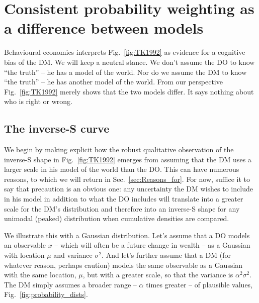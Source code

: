 \documentclass[a4paper, 12pt]{article}
\newcommand{\fref}[1]{Fig.~\ref{fig:#1}}
\newcommand{\seclabel}[1]{\label{sec:#1}}
\newcommand{\secref}[1]{Sec.~\ref{sec:#1}}
\newcommand{\MK}[1]{{\it ***MK: #1 MK***}}
\begin{document}


\section{Consistent probability weighting as a difference between models} \seclabel{ModelDiff}

Behavioural economics interprets \fref{TK1992} as evidence for a cognitive bias of the DM. We will keep a neutral stance. We don't assume the DO to know ``the truth'' -- he has a model of the world. Nor do we assume the DM to know ``the truth'' -- he has another model of the world. From our perspective \fref{TK1992} merely shows that the two models differ. It says nothing about who is right or wrong.



\subsection{The inverse-S curve\seclabel{The_inverse}}
We begin by making explicit how the robust qualitative observation of the inverse-S shape in \fref{TK1992} emerges from assuming that the DM uses a larger scale in his model of the world than the DO. This can have numerous reasons, to which we will return in \secref{Reasons_for}. For now, suffice it to say that precaution is an obvious one: any uncertainty the DM wishes to include in his model in addition to what the DO includes will translate into a greater scale for the DM's distribution and therefore into an inverse-S shape for any unimodal (peaked) distribution when cumulative densities are compared.

We illustrate this with a Gaussian distribution.
Let's assume that a DO models an observable $x$ -- which will often be a future change in wealth -- as a Gaussian with location $\mu$ and variance $\sigma^2$. And let's further assume that a DM (for whatever reason, perhaps caution) models the same observable as a Gaussian with the same location, $\mu$, but with a greater scale, so that the variance is $\alpha^2\sigma^2$. The DM simply assumes a broader range -- $\alpha$ times greater -- of plausible values, \fref{probability_dists}.
\end{document}
